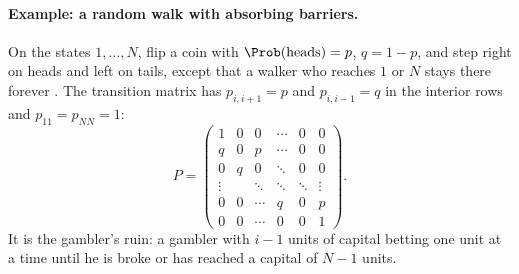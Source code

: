 \paragraph{Example: a random walk with absorbing barriers.}
On the states $1,\dots,N$, flip a coin with $\Prob(\text{heads})=p$, $q=1-p$, and step right on
heads and left on tails, except that a walker who reaches $1$ or $N$ stays there forever
. The transition matrix has $p_{i,i+1}=p$ and $p_{i,i-1}=q$ in the interior
rows and $p_{11}=p_{NN}=1$:
\begin{equation*}
  P=\begin{pmatrix}
     1&0&0&\cdots&0&0\\
     q&0&p&\cdots&0&0\\
     0&q&0&\ddots&0&0\\
     \vdots&&\ddots&\ddots&\ddots&\vdots\\
     0&0&\cdots&q&0&p\\
     0&0&\cdots&0&0&1
  \end{pmatrix}.
\end{equation*}
It is the gambler's ruin: a gambler with $i-1$ units of capital betting one unit at a time
until he is broke or has reached a capital of $N-1$ units.

